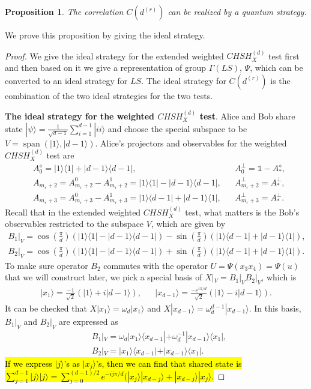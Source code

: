 \documentclass[11pt,letterpaper]{article}
\newcommand{\ket}[1]{|#1\rangle}
\newcommand{\ketbra}[2]{|#1\rangle\langle#2|}
\DeclareMathOperator{\spn}{span}
\newcommand{\1}{\mathbb{1}}
\newcommand{\CHSH}{CHSH^{(d)}}
\newcommand{\LS}{LS}
\newcommand{\dr}[1]{d^{(#1)}}
\newtheorem{proposition}[theorem]{Proposition}
\theoremstyle{definition}
\begin{document}
\begin{proposition}
	\label{prop:realize}
	The correlation $C(\dr{r})$ can be realized by a quantum strategy.
\end{proposition}
We prove this proposition by giving the ideal strategy.
\begin{proof}
We give the ideal strategy for the extended weighted $\CHSH_X$ test first and then based on it we give a representation of 
group $\Gamma(\LS)$, $\Psi$, which can be converted to an ideal strategy for $\LS$. 
The ideal strategy for $C(\dr{r})$ is the combination of the two ideal strategies for the two tests.

\textbf{The ideal strategy for the weighted $\CHSH_X$ test}.
Alice and Bob share state $\ket{\psi} = \frac{1}{\sqrt{d-1}}\sum_{i=1}^{d-1} \ket{ii}$ and choose the special subspace to be 
$V = \spn(\ket{1} ,\ket{d-1})$.
Alice's projectors and observables for the weighted $\CHSH_X$ test are
\begin{align*}
	&A_0^\diamond = \ketbra{1}{1} + \ketbra{d-1}{d-1}, &&A_0^\perp = \1 - A_\ast^\diamond, \\
	&A_{m_r+2} = A_{m_r+2}^0-A_{m_r+2}^1 = \ketbra{1}{1} - \ketbra{d-1}{d-1}, &&A_{m_r+2}^\perp = A_\ast^\perp,\\
	&A_{m_r+3} = A_{m_r+3}^0-A_{m_r+3}^1 = \ketbra{1}{d-1} + \ketbra{d-1}{1} ,&&A_{m_r+3}^\perp = A_\ast^\perp.
\end{align*}
Recall that in the extended weighted $\CHSH_X$ test, what matters is the 
Bob's observables restricted to the subspace $V$, which are given by
\begin{align*}
	B_1|_V = \cos(\frac{\pi}{d})(\ketbra{1}{1} - \ketbra{d-1}{d-1}) - \sin(\frac{\pi}{d})(\ketbra{1}{d-1} + \ketbra{d-1}{1}),\\
	B_2|_V = \cos(\frac{\pi}{d})(\ketbra{1}{1} - \ketbra{d-1}{d-1}) +\sin(\frac{\pi}{d})(\ketbra{1}{d-1} + \ketbra{d-1}{1}).
\end{align*}
To make sure operator $B_2$ commutes with the operator $U = \Psi(x_3x_4) = \Psi(u)$ that we will construct later, we pick a 
special basis of $X|_V =B_1|_VB_2|_V$, which is
\begin{align}
	\ket{x_1} = \frac{-1}{\sqrt{2}}(\ket{1} + i\ket{d-1}), &&
	\ket{x_{d-1}} = \frac{-e^{i\pi/d}}{\sqrt{2}}(\ket{1} - i\ket{d-1}).
\end{align}
It can be checked that $X\ket{x_1} = \omega_d \ket{x_1}$ and $X\ket{x_{d-1}} = \omega_d^{d-1} \ket{x_{d-1}}$.
In this basis, $B_1|_V$ and $B_2|_V$ are expressed as 
\begin{align}
	&B_1|_V = \omega_d\ketbra{x_1}{x_{d-1}} + \omega_d^{-1} \ketbra{x_{d-1}}{x_1},\\
	&B_2|_V =\ketbra{x_1}{x_{d-1}}  + \ketbra{x_{d-1}}{x_1}.
\end{align}
\hl{If we express $\ket{j}$'s as $\ket{x_j}$'s, then we can find that 
shared state is}\\
\hl{ $\sum_{j=1}^{d-1} \ket{j}\ket{j} = \sum_{j=0}^{(d-1)/2} e^{-ij\pi/d} (\ket{x_{j}}\ket{x_{d-j}} + \ket{x_{d-j}}\ket{x_{j}}$.}


\end{proof}
\end{document}
